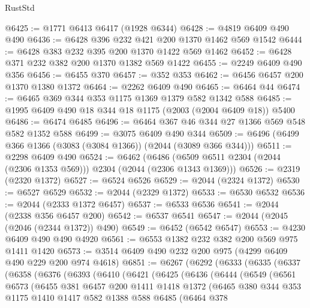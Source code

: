 \begin{lexlean}{RustStd}
\begin{coremodule}
@6425 := @1771 @6413 @6417 (@1928 @6344)
@6428 := @4819 @6409 @490 @490
@6436 := @6428 @396 @232 @421 @200 @1370 @1462 @569 @1542
@6444 := @6428 @383 @232 @395 @200 @1370 @1422 @569 @1462
@6452 := @6428 @371 @232 @382 @200 @1370 @1382 @569 @1422
@6455 := @2249 @6409 @490 @356
@6456 := @6455 @370
@6457 := @352 @353
@6462 := @6456 @6457 @200 @1370 @1380 @1372
@6464 := @2262 @6409 @490
@6465 := @6464 @44
@6474 := @6465 @369 @344 @353 @1175 @1369 @1379 @582 @1342 @588
@6485 := @1995 @6409 @490 @18 @344 @18 @1175 (@2003 (@2004 @6409 @18)) @5400
@6486 := @6474 @6485
@6496 := @6464 @367 @46 @344 @27 @1366 @569 @548 @582 @1352 @588
@6499 := @3075 @6409 @490 @344
@6509 := @6496 (@6499 @366 @1366 (@3083 (@3084 @1366)) (@2044 (@3089 @366 @344)))
@6511 := @2298 @6409 @490
@6524 := @6462
    (@6486 (@6509 @6511 @2304 (@2044 (@2306 @1353 @569))) @2304 (@2044 (@2306 @1343 @1369)))
@6526 := @2319 (@2320 @1372)
@6527 := @6524 @6526
@6529 := @2044 (@2324 @1372)
@6530 := @6527 @6529
@6532 := @2044 (@2329 @1372)
@6533 := @6530 @6532
@6536 := @2044 (@2333 @1372 @6457)
@6537 := @6533 @6536
@6541 := @2044 (@2338 @356 @6457 @200)
@6542 := @6537 @6541
@6547 := @2044 (@2045 (@2046 (@2344 @1372)) @490)
@6549 := @6452 (@6542 @6547)
@6553 := @4230 @6409 @490 @490 @4920
@6561 := @6553 @1382 @232 @382 @200 @569 @975 @1411 @1420
@6573 := @3514 @6409 @490 @232 @200 @975 (@4299 @6409 @490 @229 @200 @974 @4618)
@6851 := @6267
    (@6292
      (@6333
        (@6335
          (@6337
            (@6358
              (@6376
                (@6393
                  (@6410
                    (@6421
                      (@6425
                        (@6436
                          (@6444
                            (@6549
                              (@6561
                                @6573
                                (@6455
                                  @381
                                  @6457
                                  @200
                                  @1411
                                  @1418
                                  @1372
                                  (@6465
                                    @380
                                    @344
                                    @353
                                    @1175
                                    @1410
                                    @1417
                                    @582
                                    @1388
                                    @588
                                    @6485
                                    (@6464
                                      @378

\end{coremodule}
\end{lexlean}
